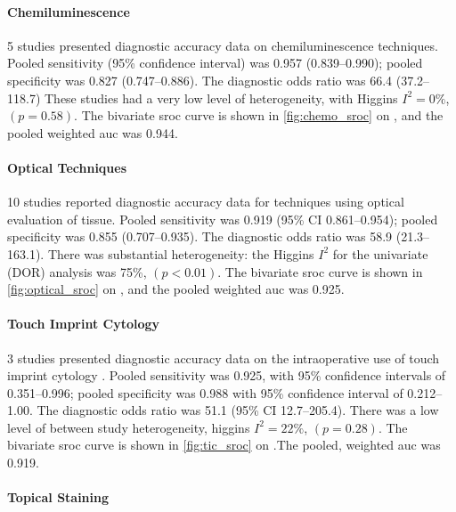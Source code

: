 \paragraph{Chemiluminescence}

5 studies presented diagnostic accuracy data on chemiluminescence techniques.
Pooled sensitivity (95\% confidence interval) was 0.957 (0.839--0.990); pooled specificity was 0.827 (0.747--0.886).
The diagnostic odds ratio was 66.4 (37.2--118.7)
These studies had a very low level of heterogeneity, with Higgins $I^2 = 0\%$, $(p=0.58)$.
The bivariate \gls{sroc} curve is shown in \cref{fig:chemo_sroc} on , and the pooled weighted \gls{auc} was 0.944.

\paragraph{Optical Techniques}

10 studies reported diagnostic accuracy data for techniques using optical evaluation of tissue.
Pooled sensitivity was 0.919 (95\% CI 0.861--0.954); pooled specificity was 0.855 (0.707--0.935).
The diagnostic odds ratio was 58.9 (21.3--163.1).
There was substantial heterogeneity: the Higgins $I^2$ for the univariate (DOR) analysis was 75\%, $(p<0.01)$.
The bivariate \gls{sroc} curve is shown in \cref{fig:optical_sroc} on , and the pooled weighted \gls{auc} was 0.925.

\paragraph{Touch Imprint Cytology}

3 studies presented diagnostic accuracy data on the intraoperative use of touch imprint cytology
.
Pooled sensitivity was 0.925, with 95\% confidence intervals of 0.351--0.996; pooled specificity was 0.988 with 95\% confidence interval of 0.212--1.00.
The diagnostic odds ratio was 51.1 (95\% CI 12.7--205.4).
There was a low level of between study heterogeneity, higgins $I^2 = 22\%$, $(p=0.28)$.
The bivariate \gls{sroc} curve is shown in \cref{fig:tic_sroc} on .The pooled, weighted \gls{auc} was 0.919.

\paragraph{Topical Staining}

